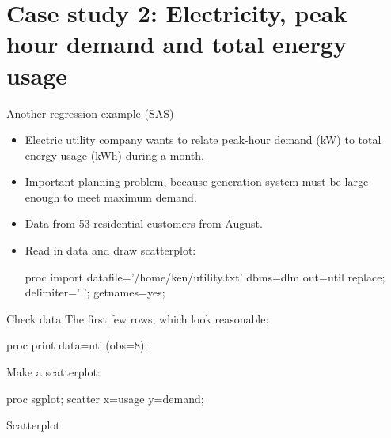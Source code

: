 \documentclass[unknownkeysallowed]{beamer}\usepackage[]{graphicx}\usepackage[]{color}
\begin{document}
\section{Case study 2: Electricity, peak hour demand and total energy usage}

\frame{\sectionpage}


\begin{frame}[fragile]{Another regression example (SAS)}

  \begin{itemize}

  \item Electric utility company wants to relate peak-hour demand (kW)
    to total energy usage (kWh) during a month.
  \item Important planning problem, because generation system must be
    large enough to meet maximum demand.
  \item Data from 53 residential customers from August.
  \item Read in data and draw scatterplot:
    \begin{Datastep}
proc import
  datafile='/home/ken/utility.txt'
    dbms=dlm
    out=util
    replace;
  delimiter=' ';
  getnames=yes;
    \end{Datastep}
    

  \end{itemize}
  
\end{frame}

\begin{frame}[fragile]{Check data}
  The first few rows, which look reasonable:

  \begin{Sascode}[store=ca]
proc print data=util(obs=8);    
  \end{Sascode}
  

Make a scatterplot:

    \begin{Sascode}[store=dda]
proc sgplot;
  scatter x=usage y=demand;
    \end{Sascode}

  
\end{frame}

\begin{frame}[fragile]{Scatterplot}


\end{frame}
\end{document}
